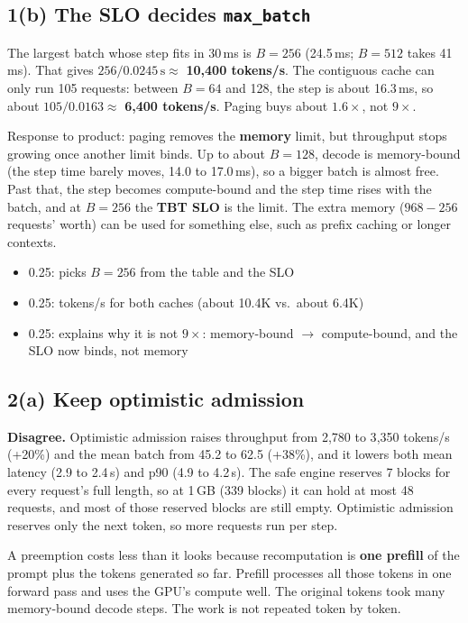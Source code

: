 \documentclass[10pt]{article}
\newenvironment{rubric}{%
  \begin{tcolorbox}[colback=black!4, colframe=black!40, boxrule=0.4pt,
                    arc=0pt, title={Rubric}, fonttitle=\bfseries\small,
                    coltitle=black, colbacktitle=black!12]
  \small\begin{itemize}[leftmargin=*, nosep]}{%
  \end{itemize}\end{tcolorbox}}
\begin{document}
\subsection*{1(b) The SLO decides \texttt{max\_batch}}

The largest batch whose step fits in 30\,ms is \textbf{$B = 256$}
(24.5\,ms; $B = 512$ takes 41\,ms). That gives $256 / 0.0245\,\text{s}
\approx$ \textbf{10{,}400 tokens/s}. The contiguous cache can only run 105
requests: between $B = 64$ and 128, the step is about 16.3\,ms, so about
$105 / 0.0163 \approx$ \textbf{6{,}400 tokens/s}. Paging buys about
\textbf{$1.6\times$}, not $9\times$.

Response to product: paging removes the \textbf{memory} limit, but
throughput stops growing once another limit binds. Up to about $B = 128$,
decode is memory-bound (the step time barely moves, 14.0 to 17.0\,ms), so
a bigger batch is almost free. Past that, the step becomes compute-bound
and the step time rises with the batch, and at $B = 256$ the \textbf{TBT
SLO} is the limit. The extra memory ($968 - 256$ requests' worth) can be
used for something else, such as prefix caching or longer contexts.

\begin{rubric}
\item 0.25: picks $B = 256$ from the table and the SLO
\item 0.25: tokens/s for both caches (about 10.4K vs.\ about 6.4K)
\item 0.25: explains why it is not $9\times$: memory-bound $\to$
  compute-bound, and the SLO now binds, not memory
\end{rubric}

\subsection*{2(a) Keep optimistic admission}

\textbf{Disagree.} Optimistic admission raises throughput from 2{,}780 to
3{,}350 tokens/s (+20\%) and the mean batch from 45.2 to 62.5 (+38\%), and
it lowers both mean latency (2.9 to 2.4\,s) and p90 (4.9 to 4.2\,s). The
safe engine reserves 7 blocks for every request's full length, so at
1\,GB (339 blocks) it can hold at most 48 requests, and most of those
reserved blocks are still empty. Optimistic admission reserves only the
next token, so more requests run per step.

A preemption costs less than it looks because recomputation is
\textbf{one prefill} of the prompt plus the tokens generated so far.
Prefill processes all those tokens in one forward pass and uses the GPU's
compute well. The original tokens took many memory-bound decode steps. The
work is not repeated token by token.
\end{document}
